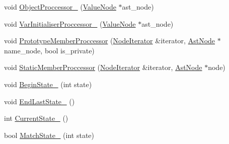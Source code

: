 \begin{DoxyCompactItemize}
\item 
void \hyperlink{classmocha_1_1_codegen_visitor_a9ca58184fa0084e484c76b1df527e6f0}{ObjectProccessor\_\-} (\hyperlink{classmocha_1_1_value_node}{ValueNode} $\ast$ast\_\-node)
\item 
void \hyperlink{classmocha_1_1_codegen_visitor_a47a692c054c25c49b1dc6697e21c187e}{VarInitialiserProccessor\_\-} (\hyperlink{classmocha_1_1_value_node}{ValueNode} $\ast$ast\_\-node)
\item 
void \hyperlink{classmocha_1_1_codegen_visitor_a4287a8c66135cf5b8c04368a5d37800e}{PrototypeMemberProccessor} (\hyperlink{classmocha_1_1_node_iterator}{NodeIterator} \&iterator, \hyperlink{classmocha_1_1_ast_node}{AstNode} $\ast$name\_\-node, bool is\_\-private)
\item 
void \hyperlink{classmocha_1_1_codegen_visitor_a243944b3a75886d451294ff344fd0bc4}{StaticMemberProccessor} (\hyperlink{classmocha_1_1_node_iterator}{NodeIterator} \&iterator, \hyperlink{classmocha_1_1_ast_node}{AstNode} $\ast$node)
\item 
void \hyperlink{classmocha_1_1_codegen_visitor_a7b254fb143b78dc6588ae6ad1f6bd7c4}{BeginState\_\-} (int state)
\item 
void \hyperlink{classmocha_1_1_codegen_visitor_afad33b6f54ceca8cb14dbbbd19f19630}{EndLastState\_\-} ()
\item 
int \hyperlink{classmocha_1_1_codegen_visitor_a195a3b729f7caab1181694da6afd7e5e}{CurrentState\_\-} ()
\item 
bool \hyperlink{classmocha_1_1_codegen_visitor_a2ba9effeb2147f147b7514cc6cc01e48}{MatchState\_\-} (int state)
\end{DoxyCompactItemize}
